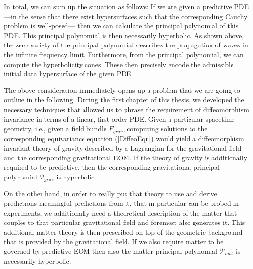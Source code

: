 In total, we can sum up the situation as follows: If we are given a predictive PDE ---in the sense that there exist hypersurfaces such that the corresponding Cauchy problem is well-posed--- then we can calculate the principal polynomial of this PDE. This principal polynomial is then necessarily hyperbolic. As shown above, the zero variety of the principal polynomial describes the propagation of waves in the infinite frequency limit. Furthermore, from the principal polynomial, we can compute the hyperbolicity cones. These then precisely encode the admissible initial data hypersurface of the given PDE.

The above consideration immediately opens up a problem that we are going to outline in the following. During the first chapter of this thesis, we developed the necessary techniques that allowed us to phrase the requirement of diffeomorphism invariance in terms of a linear, first-order PDE. Given a particular spacetime geometry, i.e., given a field bundle $F_{grav}$, computing solutions to the corresponding equivariance equation (\ref{DiffeoEqn}) would yield a diffeomorphism invariant theory of gravity described by a Lagrangian for the gravitational field and the corresponding gravitational EOM.
If the theory of gravity is additionally required to be predictive, then the corresponding gravitational principal polynomial $\mathcal{P}_{grav}$ is hyperbolic.

On the other hand, in order to really put that theory to use and derive predictions meaningful predictions from it, that in particular can be probed in experiments, we additionally need a theoretical description of the matter that couples to that particular gravitational field and foremost also generates it.
This additional matter theory is then prescribed on top of the geometric background that is provided by the gravitational field. If we also require matter to be governed by predictive EOM then also the matter principal polynomial $\mathcal{P}_{mat}$ is necessarily hyperbolic.


